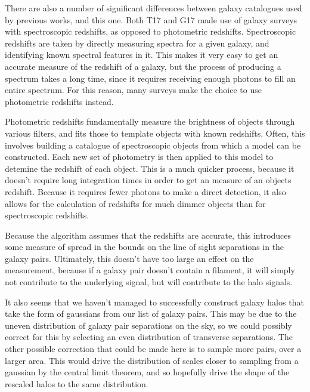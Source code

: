 \par There are also a number of significant differences between galaxy catalogues used by previous works, and this one. Both T17 and G17 made use of galaxy surveys with spectroscopic redshifts, as opposed to photometric redshifts. Spectroscopic redshifts are taken by directly measuring spectra for a given galaxy, and identifying known spectral features in it. This makes it very easy to get an accurate measure of the redshift of a galaxy, but the process of producing a spectrum takes a long time, since it requires receiving enough photons to fill an entire spectrum. For this reason, many surveys make the choice to use photometric redshifts instead.

\par Photometric redshifts fundamentally measure the brightness of objects through various filters, and fits those to template objects with known redshifts. Often, this involves building a catalogue of spectroscopic objects from which a model can be constructed. Each new set of photometry is then applied to this model to detemine the redshift of each object. This is a much quicker process, because it doesn't require long integration times in order to get an measure of an objects redshift. Because it requires fewer photons to make a direct detection, it also allows for the calculation of redshifts for much dimmer objects than for spectroscopic redshifts. 

\par Because the algorithm assumes that the redshifts are accurate, this introduces some measure of spread in the bounds on the line of sight separations in the galaxy pairs. Ultimately, this doesn't have too large an effect on the measurement, because if a galaxy pair doesn't contain a filament, it will simply not contribute to the underlying signal, but will contribute to the halo signals.  

\par It also seems that we haven't managed to successfully construct galaxy halos that take the form of gaussians from our list of galaxy pairs. This may be due to the uneven distribution of galaxy pair separations on the sky, so we could possibly correct for this by selecting an even distribution of transverse separations. The other possible correction that could be made here is to sample more pairs, over a larger area. This would drive the distribution of scales closer to sampling from a gaussian by the central limit theorem, and so hopefully drive the shape of the rescaled halos to the same distribution. 

